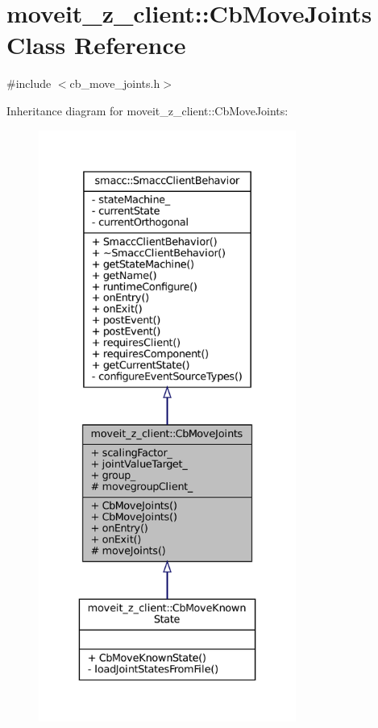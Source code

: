 \hypertarget{classmoveit__z__client_1_1CbMoveJoints}{}\section{moveit\+\_\+z\+\_\+client\+:\+:Cb\+Move\+Joints Class Reference}
\label{classmoveit__z__client_1_1CbMoveJoints}


{\ttfamily \#include $<$cb\+\_\+move\+\_\+joints.\+h$>$}



Inheritance diagram for moveit\+\_\+z\+\_\+client\+:\+:Cb\+Move\+Joints\+:
\nopagebreak
\begin{figure}[H]
\begin{center}
\leavevmode
\includegraphics[height=550pt]{classmoveit__z__client_1_1CbMoveJoints__inherit__graph}
\end{center}
\end{figure}



